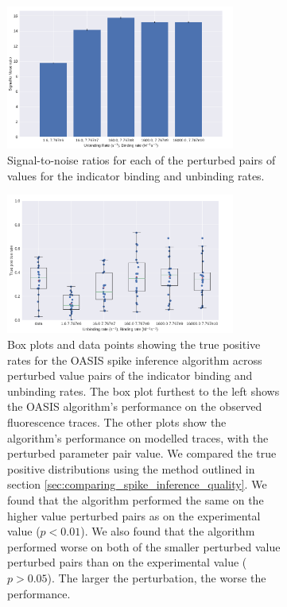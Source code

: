 \documentclass[a4paper,12pt]{article}
\theoremstyle{definition}
\begin{document}
\begin{figure}[p]
  \begin{subfigure}{\textwidth}
    \centering
    \includegraphics[width=0.825\textwidth]{figures/b_i_f_i_perturbed_snr.png}
    \caption{Signal-to-noise ratios for each of the perturbed pairs of values for the indicator binding and unbinding rates.}
    \label{fig:b_i_f_i_perturbed_snr}
  \end{subfigure}
  \begin{subfigure}{\textwidth}
    \centering
    \includegraphics[width=0.825\textwidth]{figures/b_i_f_i_perturbed_oasis_tp.png}
    \caption{Box plots and data points showing the true positive rates for the OASIS spike inference algorithm across perturbed value pairs of the indicator binding and unbinding rates. The box plot furthest to the left shows the OASIS algorithm's performance on the observed fluorescence traces. The other plots show the algorithm's performance on modelled traces, with the perturbed parameter pair value. We compared the true positive distributions using the method outlined in section \ref{sec:comparing_spike_inference_quality}. We found that the algorithm performed the same on the higher value perturbed pairs as on the experimental value ($p < 0.01$). We also found that the algorithm performed worse on both of the smaller perturbed value perturbed pairs than on the experimental value ($p > 0.05$). The larger the perturbation, the worse the performance.}
    \label{fig:b_i_f_i_perturbed_spike_inference_oasis}
  \end{subfigure}
  \caption{}
\end{figure}
\end{document}
